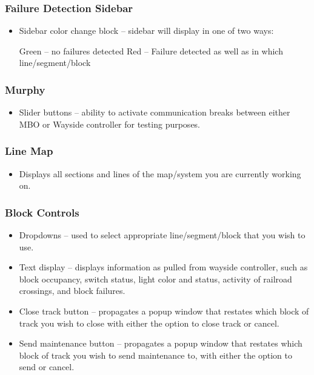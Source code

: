 	\subsubsection{Failure Detection Sidebar}
		\begin{itemize}
			\item Sidebar color change block – sidebar will display in one of two ways:
				\begin{itemize}	
					\itemo	Green – no failures detected
					\itemo	Red – Failure detected as well as in which line/segment/block
				\end{itemize}
		\end{itemize}

	\subsubsection{Murphy}
		\begin{itemize}
			\item Slider buttons – ability to activate communication breaks between either MBO or Wayside controller for testing purposes.
		\end{itemize}

	\subsubsection{Line Map}
		\begin{itemize}
			\item Displays all sections and lines of the map/system you are currently working on.
		\end{itemize}

	\subsubsection{Block Controls}
		\begin{itemize}
			\item Dropdowns – used to select appropriate line/segment/block that you wish to use.
			\item Text display – displays information as pulled from wayside controller, such as block occupancy, switch status, light color and status, activity of railroad crossings, and block failures.
			\item Close track button – propagates a popup window that restates which block of track you wish to close with either the option to close track or cancel.
			\item Send maintenance button – propagates a popup window that restates which block of track you wish to send maintenance to, with either the option to send or cancel.
		\end{itemize}

